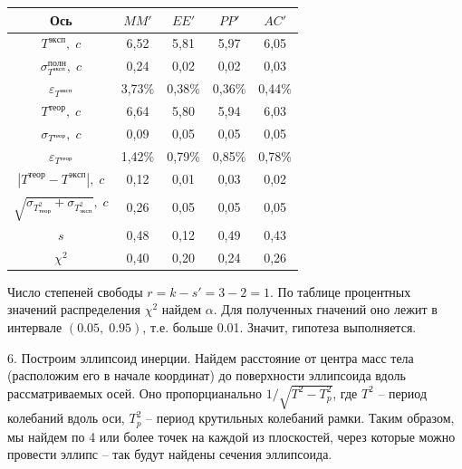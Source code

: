 \documentclass[a4paper, 12pt]{article}
\begin{document}
        \begin{table}
            \centering
            \begin{tabular}{|c|c|c|c|c|}
                \hline
                Ось                                                  & $MM'$  & $EE'$  & $PP'$  & $AC'$  \\ 
                \hline
                \hline
                $T^{эксп},\;c$                                       & 6,52   & 5,81   & 5,97   & 6,05   \\ 
                \hline
                $\sigma_{T^{эксп}}^{полн},\;c$                       & 0,24   & 0,02   & 0,02   & 0,03   \\ 
                \hline
                $\varepsilon_{T^{эксп}}$                             & 3,73\% & 0,38\% & 0,36\% & 0,44\% \\
                \hline
                \hline
                $T^{теор},\;c$                                       & 6,64   & 5,80   & 5,94   & 6,03   \\ 
                \hline
                $\sigma_{T^{теор}},\;c$                              & 0,09   & 0,05   & 0,05   & 0,05   \\ 
                \hline
                $\varepsilon_{T^{теор}}$                             & 1,42\% & 0,79\% & 0,85\% & 0,78\% \\ 
                \hline
                \hline
                $|T^{теор}-T^{эксп}|,\;c$                            & 0,12   & 0,01   & 0,03   & 0,02   \\ 
                \hline
                $\sqrt{\sigma_{T_{теор}^2}+\sigma_{T_{эксп}^2}},\;c$ & 0,26   & 0,05   & 0,05   & 0,05   \\ 
                \hline
                $s$                                                  & 0,48   & 0,12   & 0,49   & 0,43   \\ 
                \hline
                $\chi^2$                                             & 0,40 & 0,20 & 0,24 & 0,26 \\ 
                \hline
            \end{tabular}
        \end{table}
        
        Число степеней свободы $r = k - s' = 3 - 2 = 1$. По таблице процентных значений распределения $\chi^2$ найдем $\alpha$. Для полученных гначений оно лежит в интервале $(0.05,\;0.95)$, т.е. больше 0.01. Значит, гипотеза выполняется.

        6. Построим эллипсоид инерции. Найдем расстояние от центра масс тела (расположим его в начале координат) до поверхности эллипсоида вдоль рассматриваемых осей. Оно пропорцианально $1/\sqrt{T^2-T_p^2}$, где $T^2$ -- период колебаний вдоль оси, $T_p^2$ -- период крутильных колебаний рамки. Таким образом, мы найдем по 4 или более точек на каждой из плоскостей, через которые можно провести эллипс -- так будут найдены сечения эллипсоида.
\end{document}
